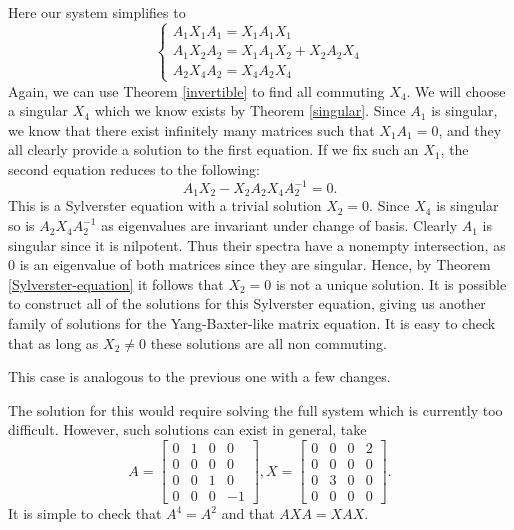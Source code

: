\documentclass{article}
\begin{document}
\begin{algorithm}
  \begin{case}[$X_3 = 0, X_2 \neq 0$]
    Here our system simplifies to
    \[\begin{cases}
      A_1 X_1 A_1 = X_1 A_1 X_1\\
      A_1 X_2 A_2 = X_1 A_1 X_2 + X_2 A_2 X_4\\
      A_2 X_4 A_2 = X_4 A_2 X_4
    \end{cases}\]
    Again, we can use Theorem \ref{invertible} to find all commuting $X_4$.
    We will choose a singular $X_4$ which we know exists by Theorem \ref{singular}.
    Since $A_1$ is singular, we know that there exist infinitely many matrices such that $X_1 A_1 = 0$, and they all clearly provide a solution to the first equation.
    If we fix such an $X_1$, the second equation reduces to the following:
    \[A_1 X_2 - X_2 A_2 X_4 A_2^{-1} = 0.\]
    This is a Sylverster equation with a trivial solution $X_2 = 0$.
    Since $X_4$ is singular so is $A_2 X_4 A_2^{-1}$ as eigenvalues are invariant under change of basis.
    Clearly $A_1$ is singular since it is nilpotent.
    Thus their spectra have a nonempty intersection, as $0$ is an eigenvalue of both matrices since they are singular.
    Hence, by Theorem \ref{Sylverster-equation} it follows that $X_2 = 0$ is not a unique solution.
    It is possible to construct all of the solutions for this Sylverster equation, giving us another family of solutions for the Yang-Baxter-like matrix equation.
    It is easy to check that as long as $X_2 \neq 0$ these solutions are all non commuting.
  \end{case}

  \begin{case}[$X_2 = 0, X_3 \neq 0$]
    This case is analogous to the previous one with a few changes.
  \end{case}

  \begin{case}
    The solution for this would require solving the full system which is currently too difficult.
    However, such solutions can exist in general, take
    \[A = \begin{bmatrix} 0 & 1 & 0 & 0\\ 0 & 0 & 0 & 0\\ 0 & 0 & 1 & 0\\ 0 & 0 & 0 & -1 \end{bmatrix}, X = \begin{bmatrix} 0 & 0 & 0 & 2\\ 0 & 0 & 0 & 0\\ 0 & 3 & 0 & 0\\ 0 & 0 & 0 & 0 \end{bmatrix}.\]
    It is simple to check that $A^4 = A^2$ and that $A X A = X A X$.
  \end{case}
\end{algorithm}
\end{document}
